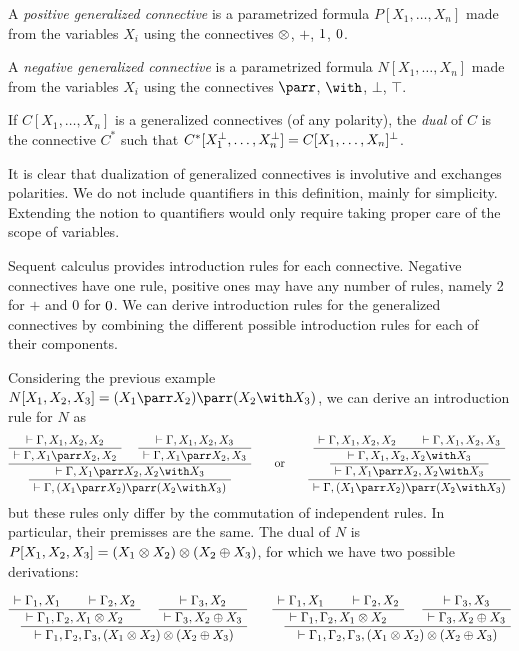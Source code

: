 \begin{definition}
A \emph{positive generalized connective} is a parametrized formula
$P[X_1,\ldots,X_n]$ made from the variables $X_i$ using the connectives
$\otimes$, $\plus$, $1$, $0$.

A \emph{negative generalized connective} is a parametrized formula
$N[X_1,\ldots,X_n]$ made from the variables $X_i$ using the connectives
$\parr$, $\with$, $\bot$, $\top$.

If $C[X_1,\ldots,X_n]$ is a generalized connectives (of any polarity), the
\emph{dual} of $C$ is the connective $C^*$ such that
$C^*[X_1^\bot,\ldots,X_n^\bot]=C[X_1,\ldots,X_n]^\bot$.
\end{definition}

It is clear that dualization of generalized connectives is involutive
and exchanges polarities. We do not include quantifiers in this
definition, mainly for simplicity. Extending the notion to quantifiers
would only require taking proper care of the scope of variables.

Sequent calculus provides introduction rules for each connective.
Negative connectives have one rule, positive ones may have any number of
rules, namely 2 for \(\plus\) and 0 for \(0\). We can derive
introduction rules for the generalized connectives by combining the
different possible introduction rules for each of their components.

Considering the previous example
\(N[X_1,X_2,X_3]=(X_1\parr X_2)\parr(X_2\with X_3)\), we can derive an
introduction rule for \(N\) as
\begin{equation*}
\AxRule{ \vdash \Gamma, X_1, X_2, X_2 }
  \UnaRule{ \vdash \Gamma, X_1\parr X_2, X_2 }
  \AxRule{ \vdash \Gamma, X_1, X_2, X_3 }
  \UnaRule{ \vdash \Gamma, X_1\parr X_2, X_3 }
  \BinRule{ \vdash \Gamma, X_1\parr X_2, X_2\with X_3 }
  \UnaRule{ \vdash \Gamma, (X_1\parr X_2)\parr(X_2\with X_3) }
  \DisplayProof
\quad\quad\text{or}\quad\quad
  \AxRule{ \vdash \Gamma, X_1, X_2, X_2 }
  \AxRule{ \vdash \Gamma, X_1, X_2, X_3 }
  \BinRule{ \vdash \Gamma, X_1, X_2, X_2\with X_3 }
  \UnaRule{ \vdash \Gamma, X_1\parr X_2, X_2\with X_3 }
  \UnaRule{ \vdash \Gamma, (X_1\parr X_2)\parr(X_2\with X_3) }
  \DisplayProof
\end{equation*}
but these rules only differ by the commutation of independent rules. In
particular, their premisses are the same. The dual of \(N\) is
\(P[X_1,X_2,X_3]=(X_1\otimes X_2)\otimes(X_2\oplus X_3)\), for which we have
two possible derivations:

\(\AxRule{ \vdash \Gamma_1, X_1 }
  \AxRule{ \vdash \Gamma_2, X_2 }
  \BinRule{ \vdash \Gamma_1, \Gamma_2, X_1\tens X_2 }
  \AxRule{ \vdash \Gamma_3, X_2 }
  \UnaRule{ \vdash \Gamma_3, X_2\plus X_3 }
  \BinRule{ \vdash \Gamma_1, \Gamma_2, \Gamma_3, (X_1\tens X_2)\tens(X_2\plus X_3) }
  \DisplayProof
\qquad
  \AxRule{ \vdash \Gamma_1, X_1 }
  \AxRule{ \vdash \Gamma_2, X_2 }
  \BinRule{ \vdash \Gamma_1, \Gamma_2, X_1\tens X_2 }
  \AxRule{ \vdash \Gamma_3, X_3 }
  \UnaRule{ \vdash \Gamma_3, X_2\plus X_3 }
  \BinRule{ \vdash \Gamma_1, \Gamma_2, \Gamma_3, (X_1\tens X_2)\tens(X_2\plus X_3) }
  \DisplayProof\)


